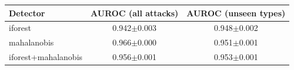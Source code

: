 \begin{tabular}{lcc}
\toprule
Detector & AUROC (all attacks) & AUROC (unseen types) \\
\midrule
iforest & 0.942$\pm$0.003 & 0.948$\pm$0.002 \\
mahalanobis & 0.966$\pm$0.000 & 0.951$\pm$0.001 \\
iforest+mahalanobis & 0.956$\pm$0.001 & 0.953$\pm$0.001 \\
\bottomrule
\end{tabular}
